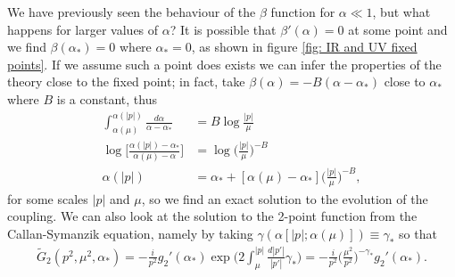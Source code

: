 We have previously seen the behaviour of the $\beta$ function for $\alpha \ll 1$, but what happens for larger values of $\alpha$? It is possible that $\beta'(\alpha) = 0$ at some point and we find $\beta(\alpha_*) = 0$ where $\alpha_* = 0$, as shown in figure \ref{fig: IR and UV fixed points}. If we assume such a point does exists we can infer the properties of the theory close to the fixed point; in fact, take $\beta(\alpha) = -B(\alpha - \alpha_*)$ close to $\alpha_*$ where $B$ is a constant, thus 
\begin{equation}
    \begin{split}
        \int_{\alpha(\mu)}^{\alpha(|p|)}\frac{d\alpha}{\alpha - \alpha_*} &= B\log{\frac{|p|}{\mu}} \\
        \log{\bigg[\frac{\alpha(|p|) - \alpha_*}{\alpha(\mu) - \alpha}\bigg]} &= \log{\bigg(\frac{|p|}{\mu}\bigg)^{-B}} \\
        \alpha(|p|) &= \alpha_* + [\alpha(\mu) - \alpha_*]\bigg(\frac{|p|}{\mu}\bigg)^{-B},
    \end{split}
\end{equation}
for some scales $|p|$ and $\mu$, so we find an exact solution to the evolution of the coupling. We can also look at the solution to the 2-point function from the Callan-Symanzik equation, namely by taking $\gamma(\alpha[|p|;\alpha(\mu)]) \equiv \gamma_*$ so that
\begin{equation}
    \begin{split}
        \tilde{G}_2(p^2,\mu^2,\alpha_*) = -\frac{i}{p^2}g_2'(\alpha_*)\exp{\bigg(2\int_\mu^{|p|}\frac{d|p'|}{|p'|}\gamma_*\bigg)} = -\frac{i}{p^2}\bigg(\frac{\mu^2}{p^2}\bigg)^{-\gamma_*}g_2'(\alpha_*).
    \end{split}
\end{equation}
